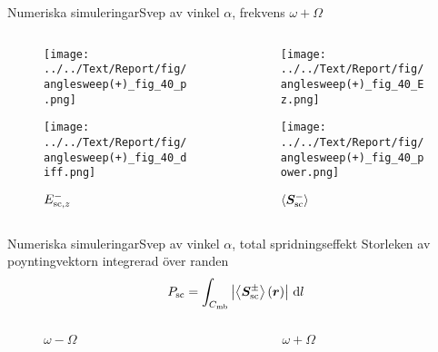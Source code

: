 \documentclass[11pt]{beamer}
\begin{document}
	\begin{frame}{Numeriska simuleringar}{Svep av vinkel $\alpha$, frekvens $\omega + \Omega$}
		\begin{columns}
			\begin{column}{0.5\textwidth}
				\begin{figure}
					\centering
					\begin{overprint}
						\texttt{[image: ../../Text/Report/fig/anglesweep(+)\_fig\_40\_p.png]}
						\caption*{$p$}
						
						\texttt{[image: ../../Text/Report/fig/anglesweep(+)\_fig\_40\_diff.png]}
						\caption*{$E_{\mathrm{sc}, z}^-$}
					\end{overprint}
				\end{figure}
			\end{column}
			\begin{column}{0.5\textwidth}
				\begin{figure}
					\centering
					\begin{overprint}
						\onslide<1>
						\texttt{[image: ../../Text/Report/fig/anglesweep(+)\_fig\_40\_Ez.png]}
						\caption*{$E_{\mrm{i}, z}$}
						
						\onslide<2>
						\texttt{[image: ../../Text/Report/fig/anglesweep(+)\_fig\_40\_power.png]}
						\caption*{$\left< \bm{S}_{\mathrm{sc}}^- \right>$}
					\end{overprint}
				\end{figure}
			\end{column}
		\end{columns}
	\end{frame}
	
	\begin{frame}{Numeriska simuleringar}{Svep av vinkel $\alpha$, total spridningseffekt}
		Storleken av poyntingvektorn integrerad över randen
		\begin{equation*}
		P_{\mathrm{sc}} = \int_{C_{\mathrm{mb}}} \left| \left< \bm{S}_{\mathrm{sc}}^\pm \right> (\bm{r}) \right|  \, \mathrm{d}l
		\end{equation*}
		\pause
		\begin{columns}
			\begin{column}{0.5\textwidth}
				\begin{figure}
					\centering
					\resizebox{\textwidth}{!}{}
					\caption*{$\omega - \Omega$}
				\end{figure}
			\end{column}
			\begin{column}{0.5\textwidth}
				\begin{figure}
					\centering
					\resizebox{\textwidth}{!}{}
					\caption*{$\omega + \Omega$}
				\end{figure}
			\end{column}
		\end{columns}
	\end{frame}
		
\end{document}
